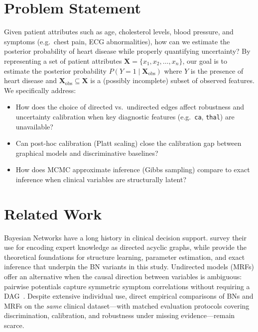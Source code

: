 \documentclass{article}
\begin{document}
\section{Problem Statement}

  Given patient attributes such as age, cholesterol levels, blood pressure,
  and symptoms (e.g.\ chest pain, ECG abnormalities), how can we estimate
  the posterior probability of heart disease while properly quantifying
  uncertainty? By representing a set of patient attributes
  $\mathbf{X} = \{x_1, x_2, \dots, x_n\}$, our goal is to estimate the
  posterior probability $P(Y{=}1 \mid \mathbf{X}_{\text{obs}})$ where $Y$ is
  the presence of heart disease and
  $\mathbf{X}_{\text{obs}} \subseteq \mathbf{X}$ is a (possibly incomplete)
  subset of observed features. We specifically address:
\begin{itemize}
      \item How does the choice of directed vs.\ undirected edges affect
            robustness and uncertainty calibration when key diagnostic
            features (e.g.\ \texttt{ca}, \texttt{thal}) are unavailable?
      \item Can post-hoc calibration (Platt scaling) close the calibration
            gap between graphical models and discriminative baselines?
      \item How does MCMC approximate inference (Gibbs sampling) compare
            to exact inference when clinical variables are structurally
            latent?
  \end{itemize}


\section{Related Work}

Bayesian Networks have a long history in clinical decision support.
\citet{korb2011bayesian} survey their use for encoding expert knowledge as
directed acyclic graphs, while \citet{koller2009pgm} provide the theoretical
foundations for structure learning, parameter estimation, and exact inference
that underpin the BN variants in this study. Undirected models (MRFs) offer
an alternative when the causal direction between variables is ambiguous:
pairwise potentials capture symmetric symptom correlations without requiring a
DAG~\cite{murphy2012mlpp}. Despite extensive individual use, direct empirical
comparisons of BNs and MRFs on the \emph{same} clinical dataset---with matched
evaluation protocols covering discrimination, calibration, and robustness
under missing evidence---remain scarce.
\end{document}

